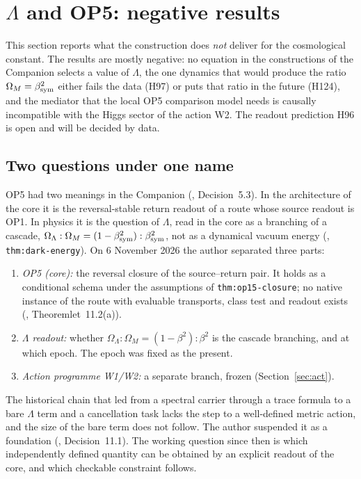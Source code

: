 \section{\texorpdfstring{$\Lambda$}{Lambda} and OP5: negative results}
\label{sec:lop5}

This section reports what the construction does \emph{not} deliver for the cosmological constant.  The results are mostly negative: no
equation in the constructions of the Companion selects a value of $\Lambda$, the one dynamics that would produce the ratio $\Omega_M=\beta_{\mathrm{sym}}^2$
either fails the data (H97) or puts that ratio in the future (H124), and the mediator that the local OP5 comparison model needs is causally
incompatible with the Higgs sector of the action W2.  The readout prediction H96 is open and will be decided by data.

\subsection{Two questions under one name}
\label{sec:lop5-split}

OP5 had two meanings in the Companion (, Decision~5.3).  In the architecture of the core it is the reversal-stable return readout of a
route whose source readout is OP1.  In physics it is the question of $\Lambda$, read in the core as a branching of a cascade,
$\Omega_\Lambda:\Omega_M=(1-\beta_{\mathrm{sym}}^2):\beta_{\mathrm{sym}}^2$, not as a dynamical vacuum energy (\cite{QSC}, \texttt{thm:dark-energy}).  On 6 November 2026 the
author separated three parts:
\begin{enumerate}
\item \emph{OP5 (core):} the reversal closure of the source--return pair.  It holds as a conditional schema under the assumptions of
\texttt{thm:op15-closure}; no native instance of the route with evaluable transports, class test and readout exists (, Theoremlet~11.2(a)).
\item \emph{$\Lambda$ readout:} whether $\Omega_\Lambda:\Omega_M=(1-\beta^2):\beta^2$ is the cascade branching, and at which epoch.  The epoch was fixed as
the present.
\item \emph{Action programme W1/W2:} a separate branch, frozen (Section~\ref{sec:act}).
\end{enumerate}
The historical chain that led from a spectral carrier through a trace formula to a bare $\Lambda$ term and a cancellation task lacks the step to a
well-defined metric action, and the size of the bare term does not follow.  The author suspended it as a foundation (, Decision~11.1).  The
working question since then is which independently defined quantity can be obtained by an explicit readout of the core, and which checkable
constraint follows.

